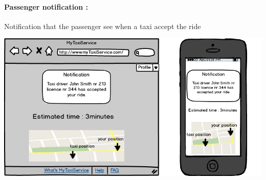 \paragraph{Passenger notification :}
Notification that the passenger see when a taxi accept the ride
\begin{center}
	\includegraphics[width=\textwidth]{mockup/PassengerNotification.png}
\end{center}
